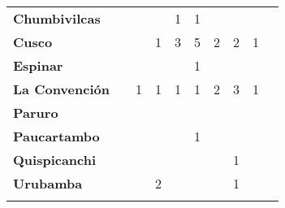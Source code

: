 \begin{tabular}{lccccccccc}
	\textbf{Chumbivilcas}                      												
	&\cellcolor[HTML]{FCC46C}
	&\cellcolor[HTML]{FCC46C}					&\cellcolor[HTML]{FCC46C}
	&1											&1
	&\cellcolor[HTML]{FCC46C}					&\cellcolor[HTML]{FCC46C}
	&\cellcolor[HTML]{FCC46C}\\
	\textbf{Cusco}                            									
	&\cellcolor[HTML]{FCC46C}					
	&\cellcolor[HTML]{FCC46C}					&1					
	&3											&5											
	&2											&2		
	&1\\								
	\textbf{Espinar}       					             									
	&\cellcolor[HTML]{FCC46C}
	&\cellcolor[HTML]{FCC46C}					&\cellcolor[HTML]{FCC46C}
	&\cellcolor[HTML]{FCC46C}					&1
	&\cellcolor[HTML]{FCC46C}					&\cellcolor[HTML]{FCC46C}
	&\cellcolor[HTML]{FCC46C}\\	
	\textbf{La Convención}                      					
	&\cellcolor[HTML]{FCC46C}
	&1											&1
	&1											&1
	&2											&3
	&1\\	
	\textbf{Paruro}                            					
	&\cellcolor[HTML]{FCC46C}					&\cellcolor[HTML]{FCC46C}					&\cellcolor[HTML]{FCC46C}					&\cellcolor[HTML]{FCC46C}					&\cellcolor[HTML]{FCC46C}					&\cellcolor[HTML]{FCC46C}
	&\cellcolor[HTML]{FCC46C} 					&\cellcolor[HTML]{FCC46C}\\
	\textbf{Paucartambo}               		                       							
	&\cellcolor[HTML]{FCC46C}
	&\cellcolor[HTML]{FCC46C}					&\cellcolor[HTML]{FCC46C}
	&\cellcolor[HTML]{FCC46C}					&1
	&\cellcolor[HTML]{FCC46C}					&\cellcolor[HTML]{FCC46C}
	&\cellcolor[HTML]{FCC46C}\\
	\textbf{Quispicanchi}                                         	      					
	&\cellcolor[HTML]{FCC46C}
	&\cellcolor[HTML]{FCC46C}					&\cellcolor[HTML]{FCC46C}
	&\cellcolor[HTML]{FCC46C}					&\cellcolor[HTML]{FCC46C}
	&\cellcolor[HTML]{FCC46C}					&1
	&\cellcolor[HTML]{FCC46C}\\
	\textbf{Urubamba}                                                      	
	&\cellcolor[HTML]{FCC46C}					&\cellcolor[HTML]{FCC46C}					&2											&\cellcolor[HTML]{FCC46C}					&\cellcolor[HTML]{FCC46C}					&\cellcolor[HTML]{FCC46C}					&1											&\cellcolor[HTML]{FCC46C}\\						
	&\multicolumn{1}{l}{}                       &\multicolumn{1}{l}{}            &\multicolumn{1}{l}{}                         
	&\multicolumn{1}{l}{}                       &\multicolumn{1}{l}{}            &\multicolumn{1}{l}{}                       &\multicolumn{1}{l}{}                       &\multicolumn{1}{l}{}            			    
\end{tabular}